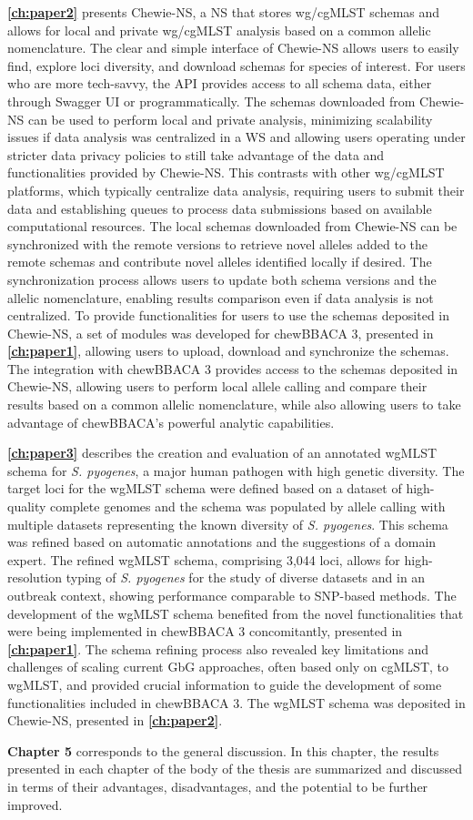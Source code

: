 \textbf{\autoref{ch:paper2}} presents \ac{Chewie-NS}, a \ac{NS} that stores \ac{wg/cgMLST} schemas and allows for local and private \ac{wg/cgMLST} analysis based on a common allelic nomenclature. The clear and simple interface of \ac{Chewie-NS} allows users to easily find, explore loci diversity, and download schemas for species of interest. For users who are more tech-savvy, the \ac{API} provides access to all schema data, either through Swagger \ac{UI} or programmatically. The schemas downloaded from \ac{Chewie-NS} can be used to perform local and private analysis, minimizing scalability issues if data analysis was centralized in a \ac{WS} and allowing users operating under stricter data privacy policies to still take advantage of the data and functionalities provided by \ac{Chewie-NS}. This contrasts with other \ac{wg/cgMLST} platforms, which typically centralize data analysis, requiring users to submit their data and establishing queues to process data submissions based on available computational resources. The local schemas downloaded from \ac{Chewie-NS} can be synchronized with the remote versions to retrieve novel alleles added to the remote schemas and contribute novel alleles identified locally if desired. The synchronization process allows users to update both schema versions and the allelic nomenclature, enabling results comparison even if data analysis is not centralized. To provide functionalities for users to use the schemas deposited in \ac{Chewie-NS}, a set of modules was developed for chewBBACA 3, presented in \textbf{\autoref{ch:paper1}}, allowing users to upload, download and synchronize the schemas. The integration with chewBBACA 3 provides access to the schemas deposited in \ac{Chewie-NS}, allowing users to perform local allele calling and compare their results based on a common allelic nomenclature, while also allowing users to take advantage of chewBBACA's powerful analytic capabilities.

\textbf{\autoref{ch:paper3}} describes the creation and evaluation of an annotated \ac{wgMLST} schema for \textit{S. pyogenes}, a major human pathogen with high genetic diversity. The target loci for the \ac{wgMLST} schema were defined based on a dataset of high-quality complete genomes and the schema was populated by allele calling with multiple datasets representing the known diversity of \textit{S. pyogenes}. This schema was refined based on automatic annotations and the suggestions of a domain expert. The refined \ac{wgMLST} schema, comprising 3,044 loci, allows for high-resolution typing of \textit{S. pyogenes} for the study of diverse datasets and in an outbreak context, showing performance comparable to SNP-based methods. The development of the \ac{wgMLST} schema benefited from the novel functionalities that were being implemented in chewBBACA 3 concomitantly, presented in \textbf{\autoref{ch:paper1}}. The schema refining process also revealed key limitations and challenges of scaling current \ac{GbG} approaches, often based only on \ac{cgMLST}, to \ac{wgMLST}, and provided crucial information to guide the development of some functionalities included in chewBBACA 3. The \ac{wgMLST} schema was deposited in \ac{Chewie-NS}, presented in \textbf{\autoref{ch:paper2}}.

\textbf{Chapter 5} corresponds to the general discussion. In this chapter, the results presented in each chapter of the body of the thesis are summarized and discussed in terms of their advantages, disadvantages, and the potential to be further improved.
